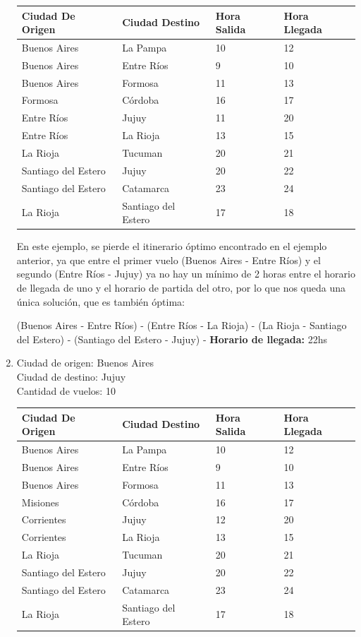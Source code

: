 \documentclass[10pt,a4paper]{article}
\begin{document}
\begin{enumerate}
\begin{center}
	\begin{tabular}{| l | l | l | l |}
	\hline
	Ciudad De Origen & Ciudad Destino & Hora Salida & Hora Llegada\\ \hline
	Buenos Aires & La Pampa & 10 &	12\\
	Buenos Aires & Entre Ríos & 9 & 10 \\
	Buenos Aires & Formosa	&	11	& 13\\
	Formosa	& Córdoba	& 16 & 17  \\
	Entre Ríos & Jujuy	& 11 & 20\\
	Entre Ríos & La Rioja	&	13 & 15\\
	La Rioja & Tucuman	&	20 & 21\\
	Santiago del Estero & Jujuy &	20 & 22\\
	Santiago del Estero	& Catamarca & 23 & 24\\
	La Rioja & Santiago del Estero & 17&18\\
	\hline
	\end{tabular}
\end{center}


En este ejemplo, se pierde el itinerario óptimo encontrado en el ejemplo anterior, ya que entre el primer vuelo (Buenos Aires - Entre Ríos) y el segundo (Entre Ríos - Jujuy) ya no hay un mínimo de 2 horas entre el horario de llegada de uno y el horario de partida del otro, por lo que nos queda una única solución, que es también óptima:

(Buenos Aires - Entre Ríos) - (Entre Ríos - La Rioja) - (La Rioja - Santiago del Estero) - (Santiago del Estero - Jujuy) - \textbf{Horario de llegada: } 22hs\\



\item
Ciudad de origen: Buenos Aires\\
Ciudad de destino: Jujuy\\
Cantidad de vuelos: 10\\

\begin{center}
	\begin{tabular}{| l | l | l | l |}
	\hline
	Ciudad De Origen & Ciudad Destino & Hora Salida & Hora Llegada\\ \hline
	Buenos Aires & La Pampa & 10 &	12\\
	Buenos Aires & Entre Ríos & 9 & 10 \\
	Buenos Aires & Formosa	&	11	& 13\\
	Misiones	& Córdoba	& 16 & 17  \\
	Corrientes & Jujuy	& 12 & 20\\
	Corrientes & La Rioja	&	13 & 15\\
	La Rioja & Tucuman	&	20 & 21\\
	Santiago del Estero & Jujuy &	20 & 22\\
	Santiago del Estero	& Catamarca & 23 & 24\\
	La Rioja & Santiago del Estero & 17&18\\
	\hline
	\end{tabular}
\end{center}


\end{enumerate}
\end{document}
